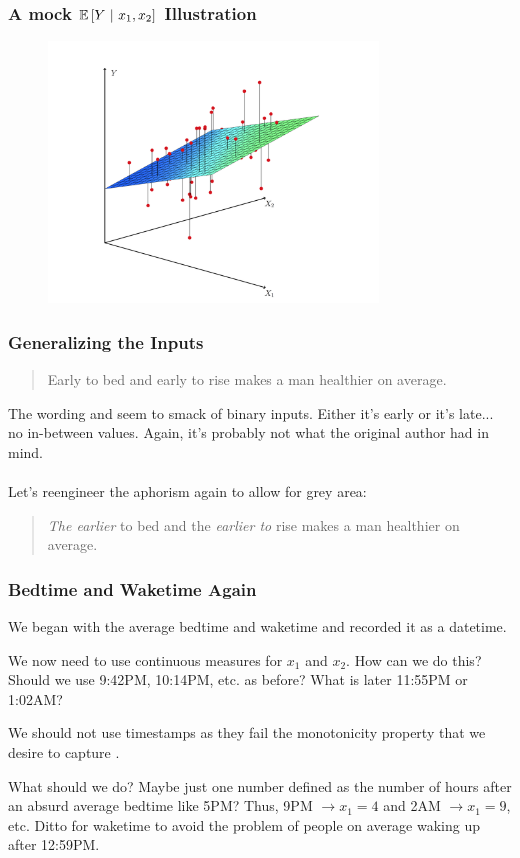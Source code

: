 \documentclass[slides]{beamer} %
\begin{document}
\begin{frame}\frametitle{A mock $\mathbb{E}\left[Y~|~x_1, x_2\right]$ Illustration}

\begin{figure}
\centering
\includegraphics[width=3.45in]{cef.png}
\end{figure}
	
\end{frame}

\begin{frame}\frametitle{Generalizing the Inputs}

\begin{quotation}
Early to bed and early to rise makes a man healthier on average.
\end{quotation}

The wording  and  seem to smack of binary inputs. Either it's early or it's late... no in-between values. Again, it's probably not what the original author had in mind.\\~\\ %

Let's reengineer the aphorism again to allow for grey area:

\begin{quotation}
\emph{The earlier} to bed and the \emph{earlier to} rise makes a man healthier on average.
\end{quotation}

\end{frame}

\begin{frame}\frametitle{Bedtime and Waketime Again}

We began with the average bedtime and waketime and recorded it as a datetime.

We now need to use continuous measures for $x_1$ and $x_2$. How can we do this? Should we use 9:42PM, 10:14PM, etc. as before? What is later 11:55PM or 1:02AM?

We should not use timestamps as they fail the monotonicity property that we desire to capture .

What should we do? Maybe just one number defined as the number of hours after an absurd average bedtime like 5PM? Thus, 9PM $\rightarrow x_1 = 4$ and 2AM $\rightarrow x_1 = 9$, etc. Ditto for waketime to avoid the problem of people on average waking up after 12:59PM.
	
\end{frame}
\end{document}
